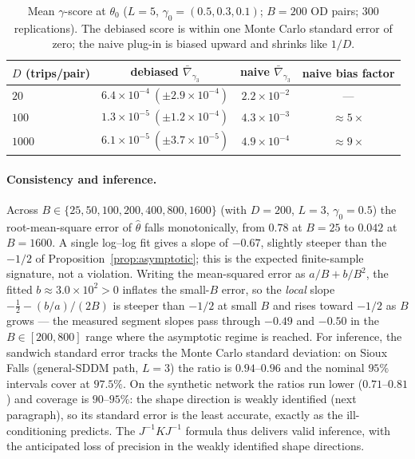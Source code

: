 \documentclass[12pt]{article}
\begin{document}
\begin{table}[ht]
\centering
\caption{Mean $\gamma$-score at $\theta_0$ ($L=5$, $\gamma_0=(0.5,0.3,0.1)$;
$B=200$ OD pairs; $300$ replications). The debiased score is within one Monte
Carlo standard error of zero; the naive plug-in is biased upward and shrinks like
$1/D$.}\label{tab:sim-score}
\begin{tabular}{l ccc}
\toprule
$D$ (trips/pair) & debiased $\bar\nabla_{\gamma_3}$ & naive $\bar\nabla_{\gamma_3}$ & naive bias factor \\
\midrule
$20$   & $6.4\times10^{-4}\ (\pm 2.9\times10^{-4})$ & $2.2\times10^{-2}$ & --- \\
$100$  & $1.3\times10^{-5}\ (\pm 1.2\times10^{-4})$ & $4.3\times10^{-3}$ & $\approx 5\times$ \\
$1000$ & $6.1\times10^{-5}\ (\pm 3.7\times10^{-5})$ & $4.9\times10^{-4}$ & $\approx 9\times$ \\
\bottomrule
\end{tabular}
\end{table}

\paragraph{Consistency and inference.} Across $B\in\{25,50,100,200,400,800,1600\}$
(with $D=200$, $L=3$, $\gamma_0=0.5$) the root-mean-square error of $\hat\theta$
falls monotonically, from $0.78$ at $B=25$ to $0.042$ at $B=1600$. A single
log--log fit gives a slope of $-0.67$, slightly steeper than the $-1/2$ of
Proposition~\ref{prop:asymptotic}; this is the expected finite-sample signature,
not a violation. Writing the mean-squared error as $a/B + b/B^2$, the fitted
$b\approx 3.0\times10^2>0$ inflates the small-$B$ error, so the \emph{local} slope
$-\tfrac12-(b/a)/(2B)$ is steeper than $-1/2$ at small $B$ and rises toward $-1/2$
as $B$ grows --- the measured segment slopes pass through $-0.49$ and $-0.50$ in the
$B\in[200,800]$ range where the asymptotic regime is reached. For inference, the
sandwich standard error tracks the Monte Carlo standard deviation: on Sioux Falls
(general-SDDM path, $L=3$) the ratio is $0.94$--$0.96$ and the nominal $95\%$
intervals cover at $97.5\%$. On the synthetic network the ratios run lower
($0.71$--$0.81$) and coverage is $90$--$95\%$: the shape direction is weakly
identified (next paragraph), so its standard error is the least accurate, exactly as
the ill-conditioning predicts. The $J^{-1}KJ^{-1}$ formula thus delivers valid
inference, with the anticipated loss of precision in the weakly identified shape
directions.
\end{document}
